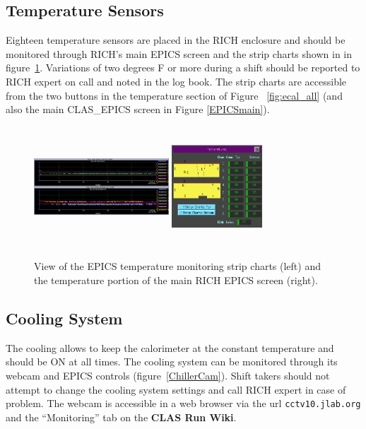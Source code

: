 \documentclass[12pt]{article}
\begin{document}
\subsection{Temperature Sensors}
Eighteen temperature sensors are placed in the RICH enclosure and should be monitored through RICH's main EPICS screen and the strip charts shown in in figure~\ref{temp2}. Variations of two degrees F or more during a shift should be reported to RICH expert on call and noted in the log book.  The strip charts are accessible from the two buttons in the temperature section of Figure ~\ref{fig:ecal_all} (and also the main CLAS\_EPICS screen in Figure \ref{EPICSmain}).
\begin{figure}[htbp]
\center
\includegraphics[width=0.45\textwidth,height=4.5cm]{pics/ECal_temp_s.png}
\includegraphics[width=0.3\textwidth,height=4.5cm]{pics/epics_ecal_temp.png}
\caption{\label{temp2} View of the EPICS temperature monitoring strip charts (left) and the temperature portion of the main RICH EPICS screen (right).}
\end{figure}

\subsection{Cooling System}
         The cooling allows to keep the calorimeter at the constant temperature and should be ON at all times. The cooling system can be monitored through its webcam and EPICS controls (figure~\ref{ChillerCam}). Shift takers should not attempt to change the cooling system settings and call RICH expert in case of problem.  The webcam is accessible in a web browser via the url \texttt{cctv10.jlab.org} and the ``Monitoring'' tab on the {\bf CLAS Run Wiki}.
\end{document}
